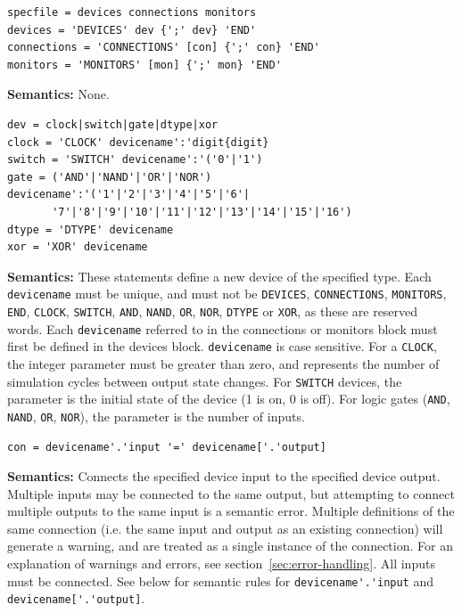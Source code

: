 \documentclass[a4paper,10pt]{article}
\begin{document}
\begin{verbatim}
specfile = devices connections monitors
devices = 'DEVICES' dev {';' dev} 'END'
connections = 'CONNECTIONS' [con] {';' con} 'END' 
monitors = 'MONITORS' [mon] {';' mon} 'END'
\end{verbatim} 

\textbf{Semantics:} None.

\begin{verbatim}
dev = clock|switch|gate|dtype|xor
clock = 'CLOCK' devicename':'digit{digit}
switch = 'SWITCH' devicename':'('0'|'1')
gate = ('AND'|'NAND'|'OR'|'NOR') devicename':'('1'|'2'|'3'|'4'|'5'|'6'|
       '7'|'8'|'9'|'10'|'11'|'12'|'13'|'14'|'15'|'16')
dtype = 'DTYPE' devicename
xor = 'XOR' devicename
\end{verbatim} 

\textbf{Semantics:} These statements define a new device of the specified type. Each \texttt{devicename} must be unique, and must not be \texttt{DEVICES}, \texttt{CONNECTIONS}, \texttt{MONITORS}, \texttt{END}, \texttt{CLOCK}, \texttt{SWITCH}, \texttt{AND}, \texttt{NAND}, \texttt{OR}, \texttt{NOR}, \texttt{DTYPE} or \texttt{XOR}, as these are reserved words.
Each \texttt{devicename} referred to in the connections or monitors block must first be defined in the devices block. \texttt{devicename} is case sensitive. For a \texttt{CLOCK}, the integer parameter must be greater than zero, and represents the number of simulation cycles between output state changes. For \texttt{SWITCH} devices, the parameter is the initial state of the device (1 is on, 0 is off).
For logic gates (\texttt{AND}, \texttt{NAND}, \texttt{OR}, \texttt{NOR}), the parameter is the number of inputs.

\begin{verbatim}
con = devicename'.'input '=' devicename['.'output]
\end{verbatim} 
\textbf{Semantics:} Connects the specified device input to the specified device output. Multiple inputs may be connected to the same output, but attempting to connect multiple outputs to the same input is a semantic error. Multiple definitions of the same connection (i.e. the same input and output as an existing connection) will generate a warning, and are treated as a single instance of the connection. For an explanation of warnings and errors, see section~\ref{sec:error-handling}. All inputs must be connected. See below for semantic rules for \verb|devicename'.'input| and \verb|devicename['.'output]|.
\end{document}
